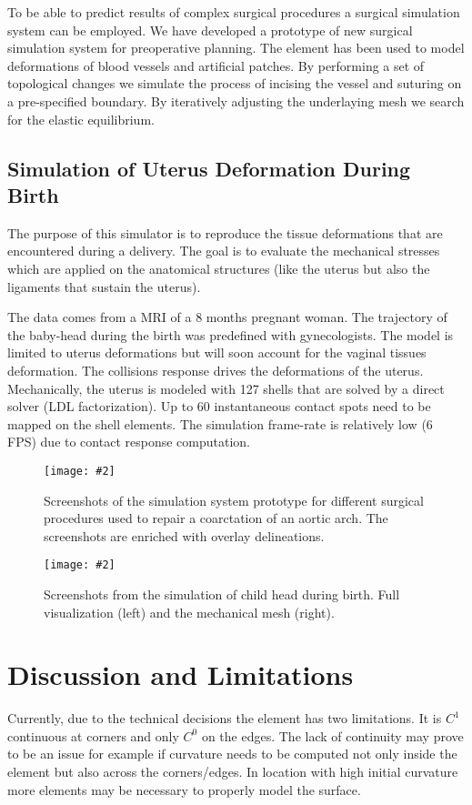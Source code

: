 \documentclass{egpubl}
\newcommand{\FigureW}[3]{%
\begin{figure*}[htb]
  \centering
  \texttt{[image: \#2]}
  \caption{\label{fig-#2}#3}
\end{figure*}}
\begin{document}
To be able to predict results of complex surgical procedures a surgical simulation system can be employed.
We have
developed a prototype \cite{Kislinskiy2012} of new surgical simulation system
for preoperative planning. The element has been used to model deformations of
blood vessels and artificial patches. By performing a set of topological changes
we simulate the process of incising the vessel and suturing on a pre-specified
boundary. By iteratively adjusting the underlaying mesh we search for the
elastic equilibrium.


\subsection{Simulation of Uterus Deformation During Birth}

The purpose of this simulator is to reproduce the tissue deformations that are encountered during a delivery.
The goal is to evaluate the mechanical stresses which are applied on the anatomical structures (like the uterus but also the ligaments that sustain the uterus).

The data comes from a MRI of a 8 months pregnant woman. 
The trajectory of the baby-head during the birth was predefined with gynecologists. 
The model is limited to uterus deformations but will soon account for the vaginal tissues deformation.
The collisions response drives the deformations of the uterus.
Mechanically, the uterus is modeled with 127 shells that are solved by a direct solver (LDL factorization).
Up to 60 instantaneous contact spots need to be mapped on the shell elements. 
The simulation frame-rate is relatively low (6 FPS) due to contact response computation.

\FigureW{\linewidth}{chd}
{Screenshots of the simulation system prototype for different surgical
procedures used to repair a coarctation of an aortic arch. The screenshots
are enriched with overlay delineations.}

\FigureW{\linewidth}{birth}
{Screenshots from the simulation of child head during birth. Full visualization (left) and the mechanical mesh (right).}



\section{Discussion and Limitations} %

Currently, due to the technical decisions the element has two limitations.
It is $C^1$ continuous at corners and only $C^0$ on the
edges. The lack of continuity may prove to be an issue for example if curvature needs to be
computed not only inside the element but also across the corners/edges.
In location with high initial curvature more elements may be necessary to properly model the surface.
\end{document}

